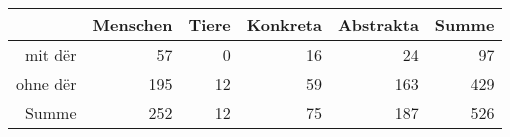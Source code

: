 \begin{tabular}{rrrrrr}
  \hline
 & Menschen & Tiere & Konkreta & Abstrakta & Summe \\ 
  \hline
mit dër & 57 & 0 & 16 & 24 & 97 \\ 
  ohne dër & 195 & 12 & 59 & 163 & 429 \\ 
  Summe & 252 & 12 & 75 & 187 & 526 \\ 
   \hline
\end{tabular}
